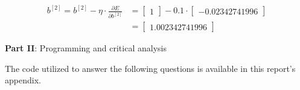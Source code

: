 \documentclass[12pt]{article}
\begin{document}
\begin{enumerate}[leftmargin=\labelsep]
          \begin{equation*}
            \begin{aligned}
              b^{[2]} = b^{[2]} - \eta \cdot \frac{\partial E}{\partial b^{[2]}}
              &= \begin{bmatrix}
                  1
                \end{bmatrix} - 0.1 \cdot \begin{bmatrix}
                  - 0.02342741996
                \end{bmatrix} \\
              &= \begin{bmatrix}
                1.002342741996
                \end{bmatrix}
            \end{aligned}
          \end{equation*}


\end{enumerate}

\pagebreak

\center\large{\textbf{Part II}: Programming and critical analysis}

\begin{justify}
  The code utilized to answer the following questions is available in this
  report's appendix.
\end{justify}
\end{document}
